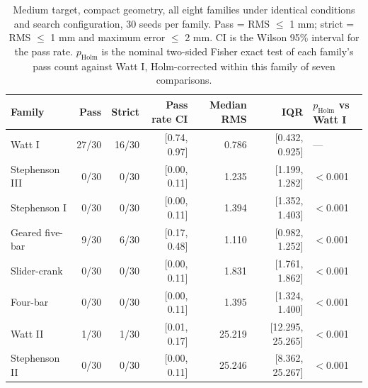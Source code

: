 \begin{table}[H]
\caption{Medium target, compact geometry, all eight families under identical conditions and search configuration, 30 seeds per family. Pass = RMS $\leq$ 1 mm; strict = RMS $\leq$ 1 mm and maximum error $\leq$ 2 mm. CI is the Wilson 95\% interval \cite{Wilson1927} for the pass rate. $p_{\mathrm{Holm}}$ is the nominal two-sided Fisher exact test of each family's pass count against Watt I, Holm-corrected within this family of seven comparisons.}
\label{tab:medium_all8}
\centering
\small
\setlength{\tabcolsep}{4pt}
\begin{tabular}{lrrrrrl}
\hline
Family & Pass & Strict & Pass rate CI & Median RMS & IQR & $p_{\mathrm{Holm}}$ vs Watt I \\
\hline
Watt I & 27/30 & 16/30 & [0.74, 0.97] & 0.786 & [0.432, 0.925] & --- \\
Stephenson III & 0/30 & 0/30 & [0.00, 0.11] & 1.235 & [1.199, 1.282] & $<$0.001 \\
Stephenson I & 0/30 & 0/30 & [0.00, 0.11] & 1.394 & [1.352, 1.403] & $<$0.001 \\
Geared five-bar & 9/30 & 6/30 & [0.17, 0.48] & 1.110 & [0.982, 1.252] & $<$0.001 \\
Slider-crank & 0/30 & 0/30 & [0.00, 0.11] & 1.831 & [1.761, 1.862] & $<$0.001 \\
Four-bar & 0/30 & 0/30 & [0.00, 0.11] & 1.395 & [1.324, 1.400] & $<$0.001 \\
Watt II & 1/30 & 1/30 & [0.01, 0.17] & 25.219 & [12.295, 25.265] & $<$0.001 \\
Stephenson II & 0/30 & 0/30 & [0.00, 0.11] & 25.246 & [8.362, 25.267] & $<$0.001 \\
\hline
\end{tabular}
\end{table}
